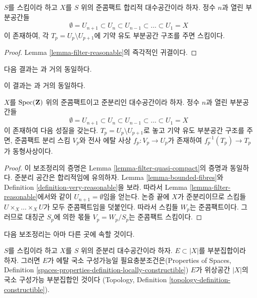 \begin{lemma}
\label{lemma-stratify-reasonable}
$S$를 스킴이라 하고 $X$를 $S$ 위의 준콤팩트 합리적 대수공간이라 하자.
정수 $n$과 열린 부분공간들
$$
\emptyset = U_{n + 1} \subset
U_n \subset U_{n - 1} \subset \ldots \subset U_1 = X
$$
이 존재하여, 각 $T_p = U_p \setminus U_{p + 1}$에 기약 유도
부분공간 구조를 주면 스킴이다.
\end{lemma}

\begin{proof}
Lemma \ref{lemma-filter-reasonable}의 즉각적인 귀결이다.
\end{proof}

\noindent
다음 결과는 \cite[Proposition 5.7.8]{GruRay}과 거의 동일하다.

\begin{lemma}
\label{lemma-filter-quasi-compact-quasi-separated}
\begin{reference}
이 결과는 \cite[Proposition 5.7.8]{GruRay}과 거의 동일하다.
\end{reference}
$X$를 $\mathop{\mathrm{Spec}}(\mathbf{Z})$ 위의 준콤팩트이고 준분리인
대수공간이라 하자. 정수 $n$과 열린 부분공간들
$$
\emptyset = U_{n + 1} \subset
U_n \subset U_{n - 1} \subset \ldots \subset U_1 = X
$$
이 존재하여 다음 성질을 갖는다. $T_p = U_p \setminus U_{p + 1}$로
놓고 기약 유도 부분공간 구조를 주면, 준콤팩트 분리 스킴 $V_p$와
전사 에탈 사상 $f_p : V_p \to U_p$가 존재하여
$f_p^{-1}(T_p) \to T_p$가 동형사상이다.
\end{lemma}

\begin{proof}
이 보조정리의 증명은 Lemma \ref{lemma-filter-quasi-compact}의 증명과
동일하다. 준분리 공간은 합리적임에 유의하자. Lemma
\ref{lemma-bounded-fibres}와 Definition
\ref{definition-very-reasonable}을 보라.
따라서 Lemma \ref{lemma-filter-reasonable}에서와 같이
$U_{n + 1} = \emptyset$임을 얻는다. 논증 끝에 $X$가 준분리이므로
스킴들 $U \times_X \ldots \times_X U$가 모두 준콤팩트임을
덧붙인다. 따라서 스킴들 $W_p$는 준콤팩트이다.
그러므로 대칭군 $S_p$에 의한 몫들 $V_p = W_p/S_p$는 준콤팩트
스킴이다.
\end{proof}

\noindent
다음 보조정리는 아마 다른 곳에 속할 것이다.

\begin{lemma}
\label{lemma-locally-constructible}
$S$를 스킴이라 하고 $X$를 $S$ 위의 준분리 대수공간이라 하자.
$E \subset |X|$를 부분집합이라 하자. 그러면 $E$가 에탈 국소
구성가능일 필요충분조건은(Properties of Spaces, Definition
\ref{spaces-properties-definition-locally-constructible})
$E$가 위상공간 $|X|$의 국소 구성가능 부분집합인 것이다
(Topology, Definition \ref{topology-definition-constructible}).
\end{lemma}

